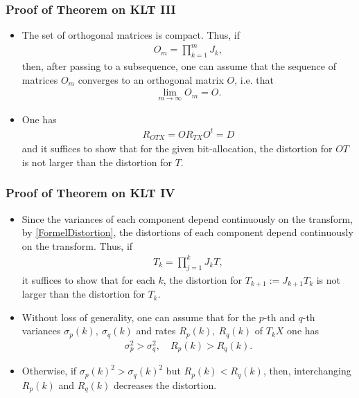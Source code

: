 \begin{frame}\frametitle{Proof of Theorem on KLT III}
\begin{itemize}
\item The set of orthogonal matrices is compact. Thus, if 
\begin{align*}
O_m=\prod_{k=1}^mJ_k,
\end{align*}
then, after passing to a subsequence, one can assume that the sequence of matrices $O_m$ converges to an orthogonal matrix $O$,  i.e. that 
\begin{align*}
\lim_{m\to\infty}O_m=O. 
\end{align*} 
\item One has 
\begin{align*}
R_{OTX}=OR_{TX}O^t=D 
\end{align*}
and it suffices to show that for the given bit-allocation, the distortion for $OT$ is not larger than the distortion for $T$. 
\end{itemize}
\end{frame}

\begin{frame}\frametitle{Proof of Theorem on KLT IV}
\begin{itemize}
\item Since the variances  of each component depend continuously on the transform, 
by \eqref{FormelDistortion}, the distortions  of each component depend continuously on the transform. Thus, 
if 
\begin{align*}
T_k=\prod_{j=1}^kJ_kT,
\end{align*}
it suffices to show that for each $k$, the distortion for 
$T_{k+1}:=J_{k+1}T_k$ is not larger than the distortion for $T_k$.  
\item Without loss of generality, one can assume that for the $p$-th and $q$-th variances $\sigma_p(k), \: \sigma_q(k)$ 
and rates $R_p(k),\: R_q(k)$ of $T_kX$ 
one has 
\begin{align*}
\sigma_p^2>\sigma_q^2, \quad R_p(k)>R_q(k). 
\end{align*}
\item Otherwise, if $\sigma_p(k)^2>\sigma_q(k)^2$ but $R_p(k)<R_q(k)$, then, interchanging $R_p(k)$ and $R_q(k)$ decreases the distortion.
\end{itemize}
\end{frame}

